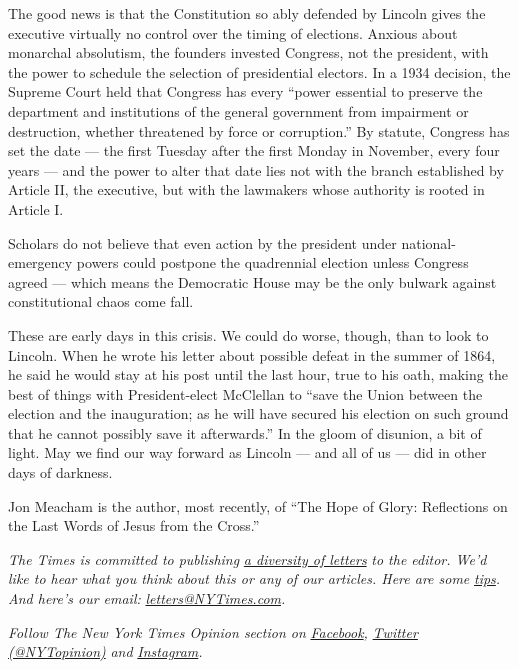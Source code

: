 The good news is that the Constitution so ably defended by Lincoln gives
the executive virtually no control over the timing of elections. Anxious
about monarchal absolutism, the founders invested Congress, not the
president, with the power to schedule the selection of presidential
electors. In a 1934 decision, the Supreme Court held that Congress has
every ``power essential to preserve the department and institutions of
the general government from impairment or destruction, whether
threatened by force or corruption.'' By statute, Congress has set the
date --- the first Tuesday after the first Monday in November, every
four years --- and the power to alter that date lies not with the branch
established by Article II, the executive, but with the lawmakers whose
authority is rooted in Article I.

Scholars do not believe that even action by the president under
national-emergency powers could postpone the quadrennial election unless
Congress agreed --- which means the Democratic House may be the only
bulwark against constitutional chaos come fall.

These are early days in this crisis. We could do worse, though, than to
look to Lincoln. When he wrote his letter about possible defeat in the
summer of 1864, he said he would stay at his post until the last hour,
true to his oath, making the best of things with President-elect
McClellan to ``save the Union between the election and the inauguration;
as he will have secured his election on such ground that he cannot
possibly save it afterwards.'' In the gloom of disunion, a bit of light.
May we find our way forward as Lincoln --- and all of us --- did in
other days of darkness.

Jon Meacham is the author, most recently, of ``The Hope of Glory:
Reflections on the Last Words of Jesus from the Cross.''

\emph{The Times is committed to publishing}
\href{https://www.nytimes3xbfgragh.onion/2019/01/31/opinion/letters/letters-to-editor-new-york-times-women.html}{\emph{a
diversity of letters}} \emph{to the editor. We'd like to hear what you
think about this or any of our articles. Here are some}
\href{https://help.nytimes3xbfgragh.onion/hc/en-us/articles/115014925288-How-to-submit-a-letter-to-the-editor}{\emph{tips}}\emph{.
And here's our email:}
\href{mailto:letters@NYTimes.com}{\emph{letters@NYTimes.com}}\emph{.}

\emph{Follow The New York Times Opinion section on}
\href{https://www.facebookcorewwwi.onion/nytopinion}{\emph{Facebook}}\emph{,}
\href{http://twitter.com/NYTOpinion}{\emph{Twitter (@NYTopinion)}}
\emph{and}
\href{https://www.instagram.com/nytopinion/}{\emph{Instagram}}\emph{.}


